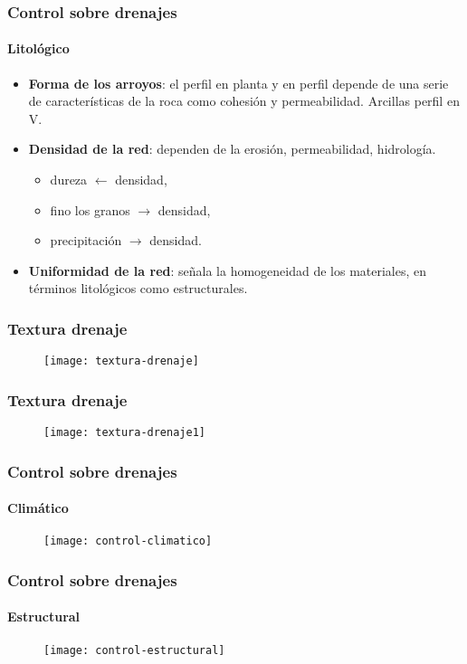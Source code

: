 \documentclass[14pt]{beamer}
\begin{document}
  \begin{frame}
\frametitle{Control sobre drenajes}
\framesubtitle{Litológico}
\begin{itemize}
\item \textbf{Forma de los arroyos}:  el perfil en planta y en perfil depende de una serie de características de la roca como cohesión y permeabilidad. Arcillas perfil en V.\\
\item \textbf{Densidad de la red}: dependen de la erosión, permeabilidad, hidrología.
\begin{itemize}
\item dureza $\leftarrow$  densidad, 
\item fino los granos $\rightarrow$  densidad, 
\item precipitación $\rightarrow$  densidad.
\end{itemize}
\item \textbf{Uniformidad de la red}: señala la homogeneidad de los materiales, en términos litológicos como estructurales. 
\end{itemize}
\end{frame}
  \begin{frame}
\frametitle{Textura drenaje}
 \begin{figure}
    \centering
    \texttt{[image: textura-drenaje]}
  \end{figure}
\end{frame}
  \begin{frame}
\frametitle{Textura drenaje}
 \begin{figure}
    \centering
    \texttt{[image: textura-drenaje1]}
  \end{figure}
\end{frame}
  \begin{frame}
\frametitle{Control sobre drenajes}
\framesubtitle{Climático}
 \begin{figure}
    \centering
    \texttt{[image: control-climatico]}
  \end{figure}
\end{frame}
  \begin{frame}
\frametitle{Control sobre drenajes}
\framesubtitle{Estructural}
 \begin{figure}
    \centering
    \texttt{[image: control-estructural]}
  \end{figure}
\end{frame}
\end{document}
